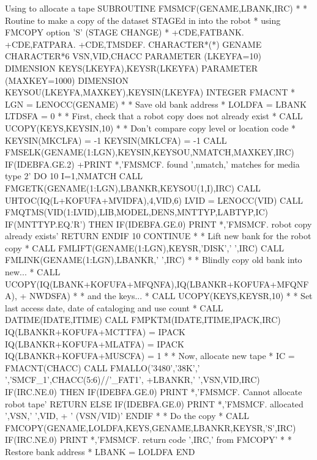 \begin{XMPt}{Using \protect{} to allocate a tape}
      SUBROUTINE FMSMCF(GENAME,LBANK,IRC)
*
*     Routine to make a copy of the dataset STAGEd in into the robot
*     using FMCOPY option 'S' (STAGE CHANGE)
*
+CDE,FATBANK.
+CDE,FATPARA.
+CDE,TMSDEF.
      CHARACTER*(*) GENAME
      CHARACTER*6   VSN,VID,CHACC
      PARAMETER (LKEYFA=10)
      DIMENSION KEYS(LKEYFA),KEYSR(LKEYFA)
      PARAMETER       (MAXKEY=1000)
      DIMENSION KEYSOU(LKEYFA,MAXKEY),KEYSIN(LKEYFA)
      INTEGER   FMACNT
*
      LGN = LENOCC(GENAME)
*
*     Save old bank address
*
      LOLDFA = LBANK
      LTDSFA = 0
*
*     First, check that a robot copy does not already exist
*
      CALL UCOPY(KEYS,KEYSIN,10)
*
*     Don't compare copy level or location code
*
      KEYSIN(MKCLFA) = -1
      KEYSIN(MKLCFA) = -1
      CALL FMSELK(GENAME(1:LGN),KEYSIN,KEYSOU,NMATCH,MAXKEY,IRC)
      IF(IDEBFA.GE.2)
     +PRINT *,'FMSMCF. found ',nmatch,' matches for media type 2'
      DO 10 I=1,NMATCH
      CALL FMGETK(GENAME(1:LGN),LBANKR,KEYSOU(1,I),IRC)
      CALL UHTOC(IQ(L+KOFUFA+MVIDFA),4,VID,6)
      LVID = LENOCC(VID)
      CALL FMQTMS(VID(1:LVID),LIB,MODEL,DENS,MNTTYP,LABTYP,IC)
      IF(MNTTYP.EQ.'R') THEN
         IF(IDEBFA.GE.0) PRINT *,'FMSMCF. robot copy already exists'
         RETURN
      ENDIF
10    CONTINUE
*
*     Lift new bank for the robot copy
*
      CALL FMLIFT(GENAME(1:LGN),KEYSR,'DISK',' ',IRC)
      CALL FMLINK(GENAME(1:LGN),LBANKR,' ',IRC)
*
*     Blindly copy old bank into new...
*
      CALL UCOPY(IQ(LBANK+KOFUFA+MFQNFA),IQ(LBANKR+KOFUFA+MFQNFA),
     +           NWDSFA)
*
*     and the keys...
*
      CALL UCOPY(KEYS,KEYSR,10)
*
*     Set last access date, date of cataloging and use count
*
      CALL DATIME(IDATE,ITIME)
      CALL FMPKTM(IDATE,ITIME,IPACK,IRC)
      IQ(LBANKR+KOFUFA+MCTTFA) = IPACK
      IQ(LBANKR+KOFUFA+MLATFA) = IPACK
      IQ(LBANKR+KOFUFA+MUSCFA) = 1
*
*     Now, allocate new tape
*
      IC = FMACNT(CHACC)
      CALL FMALLO('3480','38K',' ','SMCF_1',CHACC(5:6)//'_FAT1',
     +LBANKR,' ',VSN,VID,IRC)
      IF(IRC.NE.0) THEN
         IF(IDEBFA.GE.0) PRINT *,'FMSMCF. Cannot allocate robot tape'
         RETURN
         ELSE
         IF(IDEBFA.GE.0) PRINT *,'FMSMCF. allocated ',VSN,' ',VID,
     +                           ' (VSN/VID)'
      ENDIF
*
*     Do the copy
*
      CALL FMCOPY(GENAME,LOLDFA,KEYS,GENAME,LBANKR,KEYSR,'S',IRC)
      IF(IRC.NE.0) PRINT *,'FMSMCF. return code ',IRC,' from FMCOPY'
*
*     Restore bank address
*
      LBANK = LOLDFA
      END
 
\end{XMPt}

